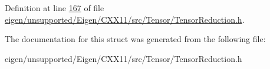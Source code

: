 Definition at line \hyperlink{eigen_2unsupported_2_eigen_2_c_x_x11_2src_2_tensor_2_tensor_reduction_8h_source_l00167}{167} of file \hyperlink{eigen_2unsupported_2_eigen_2_c_x_x11_2src_2_tensor_2_tensor_reduction_8h_source}{eigen/unsupported/\+Eigen/\+C\+X\+X11/src/\+Tensor/\+Tensor\+Reduction.\+h}.



The documentation for this struct was generated from the following file\+:\begin{DoxyCompactItemize}
\item 
eigen/unsupported/\+Eigen/\+C\+X\+X11/src/\+Tensor/\+Tensor\+Reduction.\+h\end{DoxyCompactItemize}
